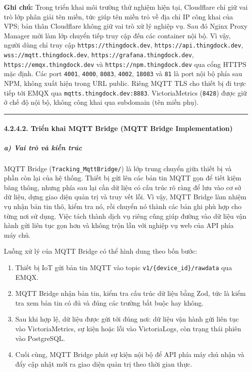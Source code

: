 \documentclass[a4paper]{extarticle}
\providecommand{\tightlist}{%
  \setlength{\itemsep}{0pt}\setlength{\parskip}{0pt}}
\begin{document}
\textbf{Ghi chú:} Trong triển khai môi trường thử nghiệm hiện tại, Cloudflare chỉ giữ vai
trò lớp phân giải tên miền, tức giúp tên miền trỏ về địa chỉ IP công khai của VPS;
bản thân Cloudflare không giữ vai trò xử lý nghiệp vụ. Sau đó Nginx Proxy Manager mới làm lớp chuyển tiếp truy cập đến các container nội
bộ. Vì vậy, người dùng chỉ truy
cập \texttt{https://thingdock.dev}, \texttt{https://api.thingdock.dev},
\texttt{wss://mqtt.thingdock.dev}, \texttt{https://grafana.thingdock.dev},
\texttt{https://emqx.thingdock.dev} và \texttt{https://npm.thingdock.dev}
qua cổng HTTPS mặc định. Các port \texttt{4001}, \texttt{4000},
\texttt{8083}, \texttt{4002}, \texttt{18083} và \texttt{81} là port nội
bộ phía sau NPM, không xuất hiện trong URL public. Riêng MQTT TLS cho
thiết bị đi trực tiếp tới EMQX qua \texttt{mqtts.thingdock.dev:8883}.
VictoriaMetrics (\texttt{8428}) được giữ ở chế độ nội bộ, không công khai
qua subdomain (tên miền phụ).


\begin{center}\rule{0.5\linewidth}{0.5pt}\end{center}

\paragraph{4.2.4.2. Triển khai MQTT Bridge (MQTT Bridge
Implementation)}\label{4242-triux1ec3n-khai-mqtt-bridge-mqtt-bridge-implementation}

\subparagraph{a) Vai trò và kiến
trúc}\label{a-vai-truxf2-vuxe0-kiux1ebfn-truxfac}

MQTT Bridge (\texttt{Tracking\_MqttBridge/}) là lớp trung chuyển giữa
thiết bị và phần còn lại của hệ thống. Thiết bị gửi lên các bản tin MQTT
gọn để tiết kiệm băng thông, nhưng phía sau lại cần dữ liệu có cấu trúc
rõ ràng để lưu vào cơ sở dữ liệu, dựng giao diện quản trị và truy vết lỗi. Vì
vậy, MQTT Bridge làm nhiệm vụ nhận bản tin thô, kiểm tra nó, rồi chuyển
nó thành các bản ghi phù hợp cho từng nơi sử dụng. Việc tách thành dịch
vụ riêng cũng giúp đường vào dữ liệu vận hành gửi liên tục gọn hơn và không trộn lẫn với
nghiệp vụ web của API phía máy chủ.

Luồng xử lý của MQTT Bridge có thể hình dung theo bốn bước:

\begin{enumerate}
\tightlist
\item
  Thiết bị IoT gửi bản tin MQTT vào topic
  \texttt{v1/\{device\_id\}/rawdata} qua EMQX.
\item
  MQTT Bridge nhận bản tin, kiểm tra cấu trúc dữ liệu bằng Zod, tức là
  kiểm tra xem bản tin có đủ và đúng các trường bắt buộc hay không.
\item
  Sau khi hợp lệ, dữ liệu được gửi tới đúng nơi: dữ liệu vận hành gửi liên tục vào
  VictoriaMetrics, sự kiện hoặc lỗi vào VictoriaLogs, còn trạng thái
  phiên vào PostgreSQL.
\item
  Cuối cùng, MQTT Bridge phát sự kiện nội bộ để API phía máy chủ nhận và đẩy cập
  nhật mới ra giao diện quản trị theo thời gian thực.
\end{enumerate}
\end{document}
